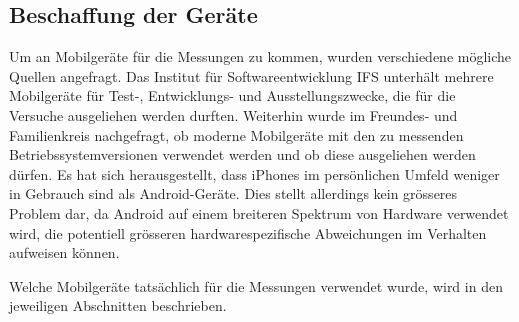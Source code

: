 \clearpage

\subsection{Beschaffung der Geräte}
Um an Mobilgeräte für die Messungen zu kommen, wurden verschiedene mögliche 
Quellen angefragt.
Das Institut für Softwareentwicklung IFS unterhält mehrere Mobilgeräte für 
Test-, Entwicklungs- und Ausstellungszwecke, die für die Versuche ausgeliehen
werden durften.
Weiterhin wurde im Freundes- und Familienkreis nachgefragt, 
ob moderne Mobilgeräte mit den zu messenden Betriebssystemversionen 
verwendet werden und ob diese ausgeliehen werden dürfen.
Es hat sich herausgestellt, dass iPhones im persönlichen Umfeld weniger in 
Gebrauch sind als Android-Geräte.
Dies stellt allerdings kein grösseres Problem dar, 
da Android auf einem breiteren Spektrum von Hardware verwendet wird, 
die potentiell grösseren hardwarespezifische Abweichungen im Verhalten aufweisen können.

Welche Mobilgeräte tatsächlich für die Messungen verwendet wurde, 
wird in den jeweiligen Abschnitten beschrieben.

\clearpage